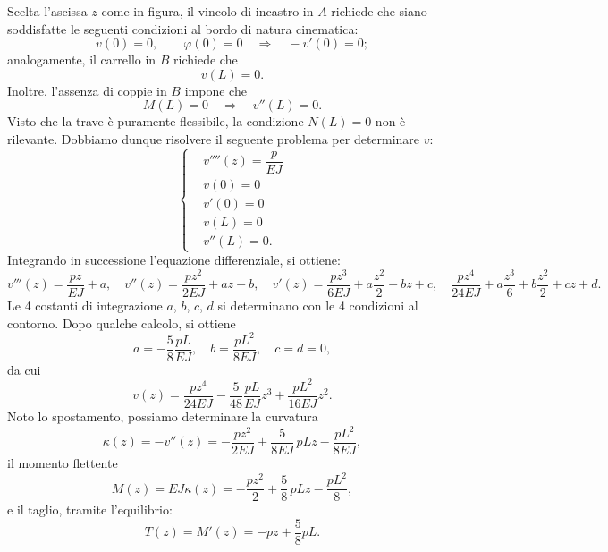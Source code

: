 \begin{exercise}
\begin{svolgimento}
Scelta l'ascissa $z$ come in figura, il vincolo di incastro in $A$ richiede che siano soddisfatte le seguenti condizioni al bordo di natura cinematica:
\begin{equation}
v(0)=0, \qquad \varphi(0)=0 \quad \Longrightarrow \quad -v'(0)=0;
\end{equation}
analogamente, il carrello in $B$ richiede che
\begin{equation}
v(L)=0.
\end{equation}
Inoltre, l'assenza di coppie  in $B$ impone che
\begin{equation}
	M(L)=0 \quad \Longrightarrow \quad  v''(L)=0.
\end{equation}
Visto che la trave è puramente flessibile, la condizione $N(L)=0$ non è rilevante.
Dobbiamo dunque risolvere il seguente problema per determinare $v$:
\begin{equation}
	\begin{cases}
&v''''(z)=\dfrac{p}{EJ}\\[.2cm]
& v(0)=0\\
& v'(0)=0\\
& v(L)=0\\
& v''(L)=0.
\end{cases}
\end{equation}
Integrando in successione l'equazione differenziale, si ottiene:
\begin{equation}
v'''(z)=\frac{pz}{EJ}+a, \quad v''(z)=\frac{pz^2}{2EJ}+az+b, \quad v'(z)=\frac{pz^3}{6EJ}+a\frac{z^2}{2}+bz+c, \quad \frac{pz^4}{24EJ}+a\frac{z^3}{6}+b\frac{z^2}{2}+cz+d.
\end{equation}
Le 4 costanti di integrazione $a$, $b$, $c$, $d$ si determinano con le 4 condizioni al contorno. Dopo qualche calcolo, si ottiene
\begin{equation}
a=-\frac{5}{8} \frac{pL}{EJ}, \quad b=\frac{pL^2}{8EJ}, \quad c=d=0,
\end{equation}
da cui
\begin{equation}
	v(z)=\frac{pz^4}{24EJ}-\frac{5}{48}\frac{pL}{EJ}z^{3}+\frac{pL^{2}}{16EJ}z^{2}.
\end{equation}
Noto lo spostamento, possiamo determinare la curvatura
\begin{equation}
	\kappa(z)=- v''(z)=-\frac{pz^2}{2EJ}+\frac{5}{8EJ}\,pLz-\frac{pL^2}{8EJ},
\end{equation}
il momento flettente
\begin{equation}
M(z)=	EJ\kappa(z)=-\frac{pz^2}{2}+\frac{5}{8}\,pLz-\frac{pL^2}{8},
\end{equation} 
e il taglio, tramite l'equilibrio:
\begin{equation}
T(z)=M'(z)=-pz+\frac{5}{8}pL.
\end{equation}


\end{svolgimento}
\end{exercise}
